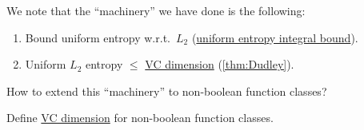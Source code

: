 We note that the ``machinery'' we have done is the following:
\begin{enumerate}
	\item Bound uniform entropy w.r.t.\ \(L_2\) (\hyperref[thm:uniform-entropy-integral-bound]{uniform entropy integral bound}).
	\item Uniform \(L_2\) entropy \(\leq \) \hyperref[def:VC-dimension]{VC dimension} (\autoref{thm:Dudley}).
\end{enumerate}

\begin{problem*}
	How to extend this ``machinery'' to non-boolean function classes?
\end{problem*}
\begin{answer}
	Define \hyperref[def:VC-dimension]{VC dimension} for non-boolean function classes.
\end{answer}
